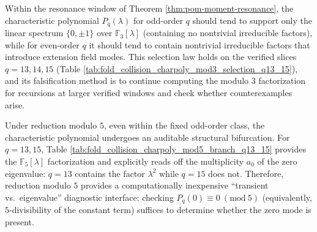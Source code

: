 \begin{conjecture}\label{conj:pom-charpoly-mod3-odd-even}
Within the resonance window of Theorem \ref{thm:pom-moment-resonance}, the characteristic polynomial \(P_q(\lambda)\) for odd-order \(q\) should tend to support only the linear spectrum \(\{0,\pm 1\}\) over \(\mathbb{F}_3[\lambda]\) (containing no nontrivial irreducible factors), while for even-order \(q\) it should tend to contain nontrivial irreducible factors that introduce extension field modes.
This selection law holds on the verified slices \(q=13,14,15\) (Table \ref{tab:fold_collision_charpoly_mod3_selection_q13_15}), and its falsification method is to continue computing the modulo \(3\) factorization for recursions at larger verified windows and check whether counterexamples arise.
\end{conjecture}

\begin{remark}\label{rem:pom-charpoly-mod5-branch}
Under reduction modulo \(5\), even within the fixed odd-order class, the characteristic polynomial undergoes an auditable structural bifurcation.
For \(q=13,15\), Table \ref{tab:fold_collision_charpoly_mod5_branch_q13_15} provides the \(\mathbb{F}_5[\lambda]\) factorization and explicitly reads off the multiplicity \(a_0\) of the zero eigenvalue: \(q=13\) contains the factor \(\lambda^2\) while \(q=15\) does not.
Therefore, reduction modulo \(5\) provides a computationally inexpensive ``transient vs.\ eigenvalue'' diagnostic interface: checking \(P_q(0)\equiv 0\ (\mathrm{mod}\ 5)\) (equivalently, \(5\)-divisibility of the constant term) suffices to determine whether the zero mode is present.
\end{remark}

